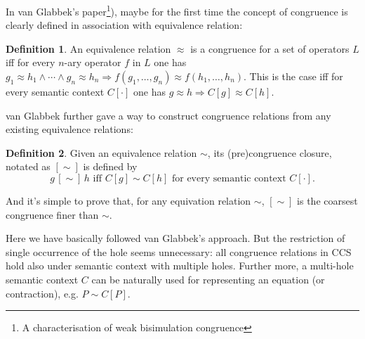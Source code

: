 \documentclass{eptcs} %
\theoremstyle{definition}
\newtheorem{definition}{Definition}[section]
\theoremstyle{proposition}
\begin{document}
In van Glabbek's paper\footnote{A characterisation of weak
  bisimulation congruence}), maybe for the first time the concept of
congruence is clearly defined in association with equivalence
relation:
\begin{definition}
An equivalence relation $\approx$ is a congruence for a set of
operators $L$ iff for every $n$-ary operator $f$ in $L$ one has
$g_1\approx h_1 \wedge \cdots \wedge g_n \approx h_n \Rightarrow
f(g_1,\ldots,g_n) \approx f(h_1,\ldots,h_n)$. This is the case iff for
every semantic context $C[\cdot]$ one has $g\approx h \Rightarrow
C[g]\approx C[h]$.
\end{definition}

van Glabbek further gave a way to construct congruence relations from
any existing equivalence relations:
\begin{definition}
\label{def:precc}
Given an equivalence relation $\sim$, its (pre)congruence closure,
notated as $[\sim]$ is defined by
\begin{equation}
g\,[\sim]\, h \mbox{ iff } C[g] \sim C[h] \mbox{ for every semantic
  context } C[\cdot].
\end{equation}
\end{definition}
And it's simple to prove that, for any equivation relation $\sim$,
$[\sim]$ is the coarsest congruence finer than $\sim$.

Here we have basically followed van Glabbek's approach. But the
restriction of single occurrence of the hole seems unnecessary: all
congruence relations in CCS hold also under semantic context with
multiple holes. Further more, a multi-hole semantic context $C$ can be
naturally used for representing an equation (or contraction), e.g. $P
\sim C[P]$.
\end{document}
